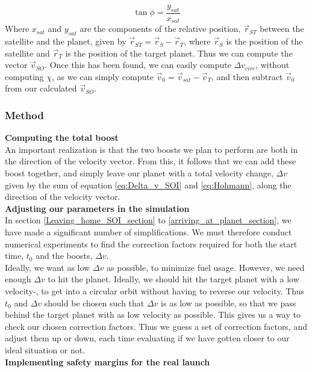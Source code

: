 \documentclass[a4paper,10pt,english]{article}
\begin{document}
$$\tan \phi = \frac{y_{sat}}{x_{sat}}$$
Where $x_{sat}$ and $y_{sat}$ are the components of the relative position, $\vec{r}_{ST}$ between the satellite and the planet, given by $\vec{r}_{ST}=\vec{r}_S-\vec{r}_T$, where  $\vec{r}_S$ is the position of the satellite and $\vec{r}_T$ is the position of the target planet. Thus we can compute the vector $\vec{v}_{SO}$. Once this has been found, we can easily compute $\Delta v_{circ}$, without computing $\chi$, as we can simply compute $\vec{v}_0=\vec{v}_{sat}-\vec{v}_T$, and then subtract $\vec{v}_0$ from our calculated $\vec{v}_{SO}$. 
\subsubsection{Method}
\textbf{Computing the total boost}\\
An important realization is that the two boosts we plan to perform are both in the direction of the velocity vector. From this, it follows that we can add these boost together, and simply leave our planet with a total velocity change, $\Delta v$ given by the sum of equation \ref{eq:Delta_v_SOI} and \ref{eq:Hohmann}, along the direction of the velocity vector.\\
\linebreak
\textbf{Adjusting our parameters in the simulation}\\
In section \ref{Leaving_home_SOI_section} to \ref{arriving_at_planet_section}, we have made a significant number of simplifications. We must therefore conduct numerical experiments to find the correction factors required for both the start time, $t_0$ and the boosts, $\Delta v$.\\
\linebreak
Ideally, we want as low $\Delta v$ as possible, to minimize fuel usage. However, we need enough $\Delta v$ to hit the planet. Ideally, we should hit the target planet with a low velocity-, to get into a circular orbit without having to reverse our velocity. Thus $t_0$ and $\Delta v$ should be chosen such that $\Delta v$ is as low as possible, so that we pass behind the target planet with as low velocity as possible. This gives us a way to check our chosen correction factors. Thus we guess a set of correction factors, and adjust them up or down, each time evaluating if we have gotten closer to our ideal situation or not.\\
\linebreak
\textbf{Implementing safety margins for the real launch}\\
\end{document}
